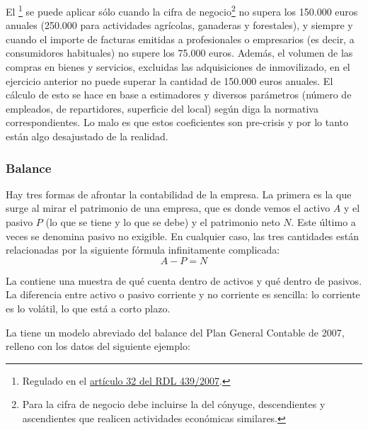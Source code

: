\documentclass[nochap,palatino,notitlepage]{apuntes}
\begin{document}
El \footnote{Regulado en el \href{https://www.boe.es/buscar/act.php?id=BOE-A-2007-6820}{artículo 32 del RDL 439/2007}.} se puede aplicar sólo cuando la cifra de negocio\footnote{Para la cifra de negocio debe incluirse la del cónyuge, descendientes y ascendientes que realicen actividades económicas similares.} no supera los 150.000 euros anuales (250.000 para actividades agrícolas, ganaderas y forestales), y siempre y cuando el importe de facturas emitidas a profesionales o empresarios (es decir, a consumidores habituales) no supere los 75.000 euros. Además, el volumen de las compras en bienes y servicios, excluidas las adquisiciones de inmovilizado, en el ejercicio anterior no puede superar la cantidad de 150.000 euros anuales. El cálculo de esto se hace en base a estimadores y diversos parámetros (número de empleados, de repartidores, superficie del local) según diga la normativa correspondientes. Lo malo es que estos coeficientes son pre-crisis y por lo tanto están algo desajustado de la realidad.%

\subsubsection{Balance}

Hay tres formas de afrontar la contabilidad de la empresa. La primera es la que surge al mirar el patrimonio de una empresa, que es donde vemos el activo $A$ y el pasivo $P$ (lo que se tiene y lo que se debe) y el patrimonio neto $N$. Este último a veces se denomina pasivo no exigible. En cualquier caso, las tres cantidades están relacionadas por la siguiente fórmula infinitamente complicada: \[ A - P = N\]

La  contiene una muestra de qué cuenta dentro de activos y qué dentro de pasivos. La diferencia entre activo o pasivo corriente y no corriente es sencilla: lo corriente es lo volátil, lo que está a corto plazo.

La  tiene un modelo abreviado del balance del Plan General Contable de 2007, relleno con los datos del siguiente ejemplo:
\end{document}
